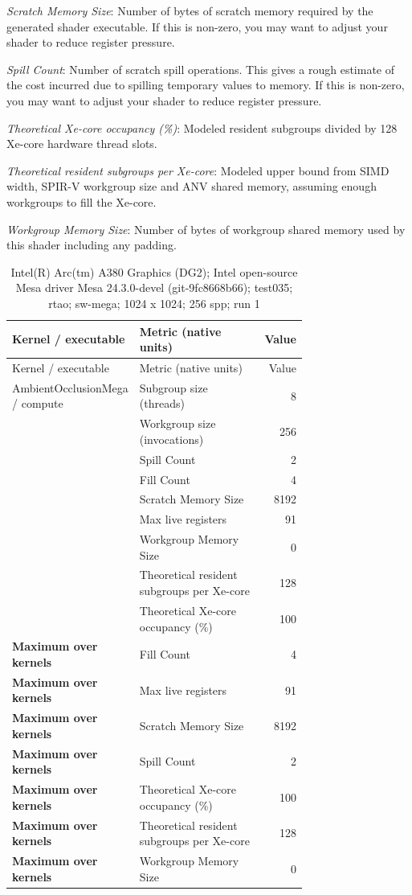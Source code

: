 \noindent\textit{Scratch Memory Size}: Number of bytes of scratch memory required by the generated shader executable.  If this is non-zero, you may want to adjust your shader to reduce register pressure.\par
\noindent\textit{Spill Count}: Number of scratch spill operations.  This gives a rough estimate of the cost incurred due to spilling temporary values to memory.  If this is non-zero, you may want to adjust your shader to reduce register pressure.\par
\noindent\textit{Theoretical Xe-core occupancy (\%)}: Modeled resident subgroups divided by 128 Xe-core hardware thread slots.\par
\noindent\textit{Theoretical resident subgroups per Xe-core}: Modeled upper bound from SIMD width, SPIR-V workgroup size and ANV shared memory, assuming enough workgroups to fill the Xe-core.\par
\noindent\textit{Workgroup Memory Size}: Number of bytes of workgroup shared memory used by this shader including any padding.\par
\begin{longtable}{p{0.30\linewidth}p{0.43\linewidth}r}
\caption{Intel(R) Arc(tm) A380 Graphics (DG2); Intel open-source Mesa driver Mesa 24.3.0-devel (git-9fc8668b66); test035; rtao; sw-mega; 1024 x 1024; 256 spp; run 1}\label{tab:hydra-profile-8}\\
\hline Kernel / executable & Metric (native units) & Value \\\hline
\endfirsthead
\hline Kernel / executable & Metric (native units) & Value \\\hline
\endhead
AmbientOcclusionMega / compute & Subgroup size (threads) & 8 \\
 & Workgroup size (invocations) & 256 \\
 & Spill Count & 2 \\
 & Fill Count & 4 \\
 & Scratch Memory Size & 8192 \\
 & Max live registers & 91 \\
 & Workgroup Memory Size & 0 \\
 & Theoretical resident subgroups per Xe-core & 128 \\
 & Theoretical Xe-core occupancy (\%) & 100 \\
\hline
\textbf{Maximum over kernels} & Fill Count & 4 \\
\textbf{Maximum over kernels} & Max live registers & 91 \\
\textbf{Maximum over kernels} & Scratch Memory Size & 8192 \\
\textbf{Maximum over kernels} & Spill Count & 2 \\
\textbf{Maximum over kernels} & Theoretical Xe-core occupancy (\%) & 100 \\
\textbf{Maximum over kernels} & Theoretical resident subgroups per Xe-core & 128 \\
\textbf{Maximum over kernels} & Workgroup Memory Size & 0 \\
\hline
\end{longtable}
